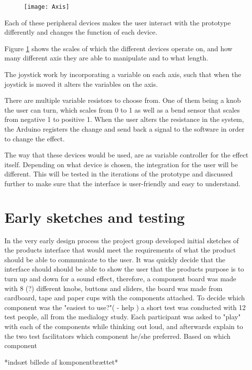 \begin{figure}[!h] 
\centering
\texttt{[image: Axis]}
\caption{\label{fig:axis}}
\end{figure}



Each of these peripheral devices makes the user interact with the prototype differently and changes the function of each device.

Figure \ref{fig:axis} shows the scales of which the different devices operate on, and how many different axis they are able to manipulate and to what length.
 
The joystick work by incorporating a variable on each axis, such that when the joystick is moved it alters the variables on the axis. 

There are multiple variable resistors to choose from. One of them being a knob the user can turn, which scales from 0 to 1 as well as a bend sensor that scales from negative 1 to positive 1. When the user alters the resistance in the system, the Arduino registers the change and send back a signal to the software in order to change the effect.

The way that these devices would be used, are as variable controller for the effect itself. Depending on what device is chosen, the integration for the user will be different. This will be tested in the iterations of the prototype and discussed further to make sure that the interface is user-friendly and easy to understand. 


\section{Early sketches and testing}
In the very early design process the project group developed initial sketches of the products interface that would meet the requirements of what the product should be able to communicate to the user. It was quickly decide that the interface should should be able to show the user that the products purpose is to turn up and down for a sound effect, therefore, a component board was made with 8 (?) different knobs, buttons and sliders, the board was made from cardboard, tape and paper cups with the components attached. To decide which component was the "easiest to use?"( - help ) a short test was conducted with 12 test people, all from the medialogy study. Each participant was asked to "play" with each of the components while thinking out loud, and afterwards explain to the two test facilitators which component he/she preferred. Based on which component 

*indsæt billede af komponentbrættet*
